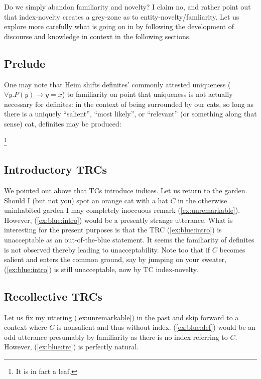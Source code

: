 \documentclass[11pt]{article}
\begin{document}
Do we simply abandon familiarity and novelty? I claim no, and rather point out that index-novelty creates a grey-zone as to entity-novelty/famliarity. Let us explore more carefully what is going on in by following the development of discourse and knowledge in context in the following sections.

\subsection{Prelude}
One may note that Heim shifts definites' commonly attested uniqueness (\(\forall y . P(y) \to y=x\)) to familiarity on point that uniqueness is not actually necessary for definites: in the context of being surrounded by our cats, so long as there is a uniquely ``salient'', ``most likely'', or ``relevant'' (or something along that sense) cat, definites may be produced:

\begin{exe}
	\footnote{It is in fact a leaf.}
\end{exe}

\subsection{Introductory TRCs}\label{sec:as-mentioned}
We pointed out above that TCs introduce indices. Let us return to the garden. Should I (but not you) spot an orange cat with a hat \(C\) in the otherwise uninhabited garden I may completely inoccuous remark (\ref{ex:unremarkable}). However, (\ref{ex:blue:intro}) would be a presently strange utterance. What is interesting for the present purposes is that the TRC (\ref{ex:blue:intro}) is unacceptable as an out-of-the-blue statement.
It seems the familiarity of definites is not observed thereby leading to unacceptability. Note too that if \(C\) becomes salient and enters the common ground, say by jumping on your sweater, (\ref{ex:blue:intro}) is still unacceptable, now by TC index-novelty.

\begin{exe}
	\label{ex:unremarkable}
	\label{ex:blue:intro}
\end{exe}

\subsection{Recollective TRCs}\label{sec:recall}
Let us fix my uttering (\ref{ex:unremarkable}) in the past and skip forward to a context where \(C\) is nonsalient and thus without index. (\ref{ex:blue:def}) would be an odd utterance presumably by familiarity as there is no index referring to \(C\). However, (\ref{ex:blue:trc}) is perfectly natural.
\end{document}
